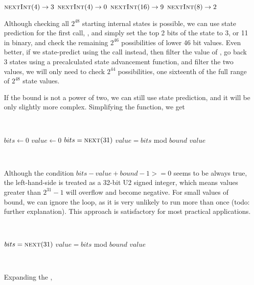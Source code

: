 \documentclass{article}
\begin{document}
\begin{algorithmic}
    \State $\Call{nextInt}{4} \to 3$
    \State $\Call{nextInt}{4} \to 0$
    \State $\Call{nextInt}{16} \to 9$
    \State $\Call{nextInt}{8} \to 2$\\
\end{algorithmic}

\noindent Although checking all $2^{48}$ starting internal states is possible, we can use state prediction for the first call, , and simply set the top 2 bits of the state to 3, or 11 in binary, and check the remaining $2^{46}$ possibilities of lower 46 bit values. 
Even better, if we state-predict using the  call instead, then filter the value of , go back 3 states using a precalculated state advancement function, and filter the two  values, we will only need to check $2^{44}$ possibilities, one sixteenth of the full range of $2^{48}$ state values. %

If the  bound is not a power of two, we can still use state prediction, and it will be only slightly more complex. Simplifying the  function, we get

\
\begin{algorithmic}
    \State $bits \gets 0$
    \State $value \gets 0$
    \Repeat
        \State $bits = \Call{next}{31}$
        \State $value = bits$ mod $bound$
    \State \Return $value$
\EndFunction
\end{algorithmic}
\ \

Although the condition $bits - value + bound - 1 >= 0$ seems to be always true, the left-hand-side is treated as a 32-bit U2 signed integer, which means values greater than $2^{31} - 1$ will overflow and become negative. For small values of bound, we can ignore the loop, as it is very unlikely to run more than once (todo: further explanation). This approach is satisfactory for most practical applications. 

\
\begin{algorithmic}
\Function{nextInt}{$bound$}
    \State $bits = \Call{next}{31}$
    \State $value = bits$ mod $bound$
    \State \Return $value$
\EndFunction
\end{algorithmic}
\ \

\noindent Expanding the ,
\end{document}
